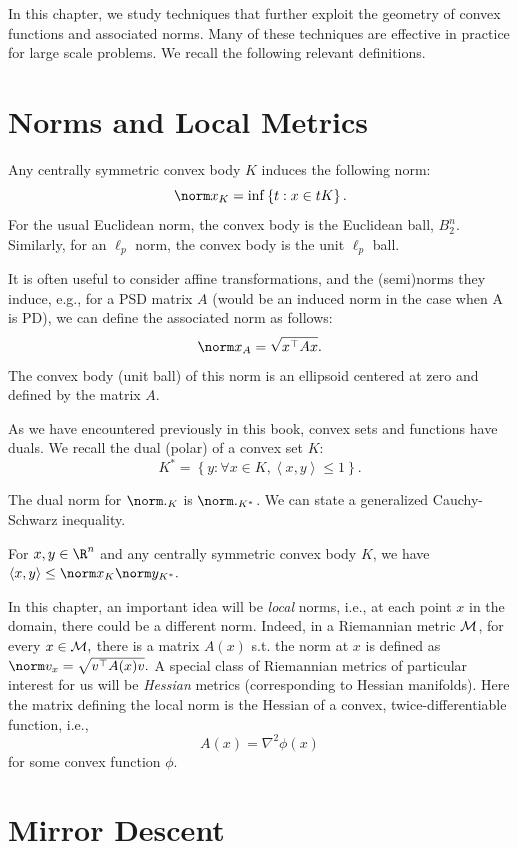 In this chapter, we study techniques that further exploit the geometry
of convex functions and associated norms. Many of these techniques
are effective in practice for large scale problems. We recall the
following relevant definitions.

\section{Norms and Local Metrics}

Any centrally symmetric convex body $K$ induces the following norm:
\[
\norm x_{K}=\inf\left\{ t:x\in tK\right\} .
\]
For the usual Euclidean norm, the convex body is the Euclidean ball,
$B_{2}^{n}$. Similarly, for an $\ell_{p}$ norm, the convex body
is the unit $\ell_{p}$ ball. 

It is often useful to consider affine transformations, and the (semi)norms
they induce, e.g., for a PSD matrix $A$ (would be an induced norm
in the case when A is PD), we can define the associated norm as follows:
\[
\norm x_{A}=\sqrt{x^{\top}Ax}.
\]
The convex body (unit ball) of this norm is an ellipsoid centered
at zero and defined by the matrix $A$. 

As we have encountered previously in this book, convex sets and functions
have duals. We recall the dual (polar) of a convex set $K$: 
\[
K^{*}=\left\{ y:\forall x\in K,\left\langle x,y\right\rangle \le1\right\} .
\]

The dual norm for $\norm ._{K}$ is $\norm ._{K^{*}}$. We can state
a generalized Cauchy-Schwarz inequality.
\begin{fact}
For $x,y\in\R^{n}$ and any centrally symmetric convex body $K$,
we have $\left\langle x,y\right\rangle \le\norm x_{K}\norm y_{K^{*}}.$
\end{fact}

In this chapter, an important idea will be \emph{local} norms, i.e.,
at each point $x$ in the domain, there could be a different norm.
Indeed, in a Riemannian metric ${\cal M}$, for every $x\in{\cal M},$
there is a matrix $A(x)$ s.t. the norm at $x$ is defined as $\norm v_{x}=\sqrt{v^{\top}A(x)v}.$
A special class of Riemannian metrics of particular interest for us
will be \emph{Hessian }metrics (corresponding to Hessian manifolds).
Here the matrix defining the local norm is the Hessian of a convex,
twice-differentiable function, i.e., 
\[
A(x)=\nabla^{2}\phi(x)
\]
for some convex function $\phi$. 


\section{Mirror Descent\label{sec:mirror_descent}}

